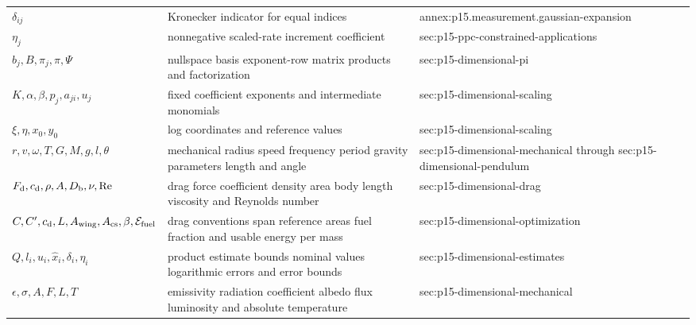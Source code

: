\begin{longtable}{@{}p{}p{}p{}@{}}
\(\delta_{ij}\) & Kronecker indicator for equal indices & annex:\allowbreak{}p15.\allowbreak{}measurement.\allowbreak{}gaussian-\allowbreak{}expansion \\
\(\eta_j\) & nonnegative scaled-rate increment coefficient & sec:\allowbreak{}p15-\allowbreak{}ppc-\allowbreak{}constrained-\allowbreak{}applications \\
\(b_j,\allowbreak B,\allowbreak \pi_j,\allowbreak \pi,\allowbreak \Psi\) & nullspace basis exponent-row matrix products and factorization & sec:\allowbreak{}p15-\allowbreak{}dimensional-\allowbreak{}pi \\
\(K,\allowbreak \alpha,\allowbreak \beta,\allowbreak p_j,\allowbreak a_{ji},\allowbreak u_j\) & fixed coefficient exponents and intermediate monomials & sec:\allowbreak{}p15-\allowbreak{}dimensional-\allowbreak{}scaling \\
\(\xi,\allowbreak \eta,\allowbreak x_0,\allowbreak y_0\) & log coordinates and reference values & sec:\allowbreak{}p15-\allowbreak{}dimensional-\allowbreak{}scaling \\
\(r,\allowbreak v,\allowbreak \omega,\allowbreak T,\allowbreak G,\allowbreak M,\allowbreak g,\allowbreak l,\allowbreak \theta\) & mechanical radius speed frequency period gravity parameters length and angle & sec:\allowbreak{}p15-\allowbreak{}dimensional-\allowbreak{}mechanical through sec:\allowbreak{}p15-\allowbreak{}dimensional-\allowbreak{}pendulum \\
\(F_{\rm d},\allowbreak c_{\rm d},\allowbreak \rho,\allowbreak A,\allowbreak D_{\rm b},\allowbreak \nu,\allowbreak \mathrm{Re}\) & drag force coefficient density area body length viscosity and Reynolds number & sec:\allowbreak{}p15-\allowbreak{}dimensional-\allowbreak{}drag \\
\(C,\allowbreak C',\allowbreak c_{\rm d},\allowbreak L,\allowbreak A_{\rm wing},\allowbreak A_{\rm cs},\allowbreak \beta,\allowbreak \mathcal E_{\rm fuel}\) & drag conventions span reference areas fuel fraction and usable energy per mass & sec:\allowbreak{}p15-\allowbreak{}dimensional-\allowbreak{}optimization \\
\(Q,\allowbreak l_i,\allowbreak u_i,\allowbreak \widehat x_i,\allowbreak \delta_i,\allowbreak \eta_i\) & product estimate bounds nominal values logarithmic errors and error bounds & sec:\allowbreak{}p15-\allowbreak{}dimensional-\allowbreak{}estimates \\
\(\epsilon,\allowbreak \sigma,\allowbreak A,\allowbreak F,\allowbreak L,\allowbreak T\) & emissivity radiation coefficient albedo flux luminosity and absolute temperature & sec:\allowbreak{}p15-\allowbreak{}dimensional-\allowbreak{}mechanical \\

\end{longtable}
